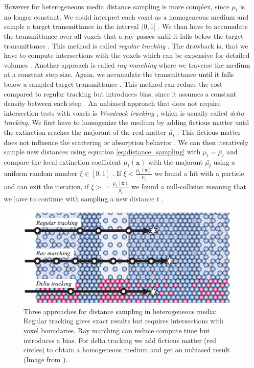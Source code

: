 However for heterogeneous media distance sampling is more complex, since $\mu_t$ is no longer constant.
We could interpret each voxel as a homogeneous medium and sample a target transmittance in the interval $(0, 1]$ \cite{novak_overview}.
We than have to accumulate the transmittance over all voxels that a ray passes until it falls below the target transmittance \cite{novak_overview}.
This method is called \textit{regular tracking} \cite{sutton_regular_tracking}.
The drawback is, that we have to compute intersections with the voxels which can be expensive for detailed volumes \cite{novak_overview}.
Another approach is called \textit{ray marching} \cite{perlin_hypertexture} where we traverse the medium at a constant step size.
Again, we accumulate the transmittance until it falls below a sampled target transmittance \cite{novak_overview}.
This method can reduce the cost compared to regular tracking but introduces bias, since it assumes a constant density between each step \cite{novak_overview}.
An unbiased approach that does not require intersection tests with voxels is \textit{Woodcock tracking} \cite{woodcock}, which is usually called \textit{delta tracking}.
We first have to homogenize the medium by adding fictious matter until the extinction reaches the majorant of the real matter $\bar{\mu_t}$ \cite{novak_overview}.
This fictious matter does not influence the scattering or absorption behavior \cite{novak_overview}.
We can then iteratively sample new distances using equation \ref{eq:distance_sampling} with $\mu_t=\bar{\mu_t}$ and compare the local extinction coefficient $\mu_t(\boldsymbol{x})$ with the majorant $\bar{\mu_t}$ using a uniform random number $\xi\in[0,1]$ \cite{spectral_and_decomposition_tracking}.
If $\xi<\frac{\mu_t(\boldsymbol{x})}{\bar{\mu_t}}$ we found a hit with a particle and can exit the iteration, if $\xi>=\frac{\mu_t(\boldsymbol{x})}{\bar{\mu_t}}$ we found a null-collision meaning that we have to continue with sampling a new distance $t$ \cite{spectral_and_decomposition_tracking}.
\begin{figure}[ht]
    \centering
    \includegraphics[width=0.8\linewidth]{img/novak_distance_sampling.png}
    \caption{Three approaches for distance sampling in heterogeneous media: Regular tracking gives exact results but requires intersections with voxel boundaries. Ray marching can reduce compute time but introduces a bias. For delta tracking we add fictious matter (red circles) to obtain a homogeneous medium and get an unbiased result (Image from \cite{novak_overview}).}
    \label{fig:novak_distance_sampling}
\end{figure}
